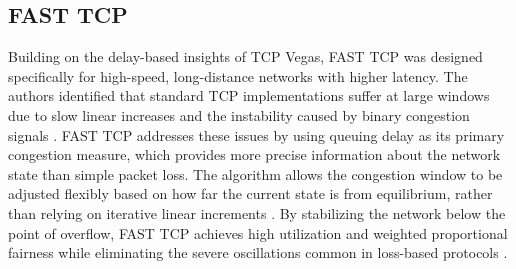 \subsection{FAST TCP}

Building on the delay-based insights of TCP Vegas, FAST TCP was designed specifically for high-speed, long-distance networks with higher latency. 
The authors identified that standard TCP implementations suffer at large windows due to slow linear increases and the instability caused by binary congestion signals \cite{FASTTCP}. 
FAST TCP addresses these issues by using queuing delay as its primary congestion measure, which provides more precise information about the network state than simple packet loss. 
The algorithm allows the congestion window to be adjusted flexibly based on how far the current state is from equilibrium, rather than relying on iterative linear increments \cite{FASTTCP}. 
By stabilizing the network below the point of overflow, FAST TCP achieves high utilization and weighted proportional fairness while eliminating the severe oscillations common in loss-based protocols \cite{FASTTCP}.